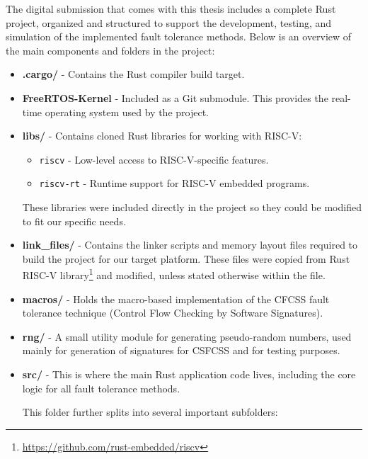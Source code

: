 \documentclass[12pt, letterpaper, slovak]{article}
\begin{document}
\begin{appendices}
The digital submission that comes with this thesis includes a complete Rust project, organized and structured to support the development, testing, and simulation of the implemented fault tolerance methods. Below is an overview of the main components and folders in the project:

\begin{itemize}
    \item \textbf{.cargo/} - Contains the Rust compiler build target.
    
    \item \textbf{FreeRTOS-Kernel} - Included as a Git submodule. This provides the real-time operating system used by the project.
    
    \item \textbf{libs/} - Contains cloned Rust libraries for working with RISC-V:
    \begin{itemize}
        \item \texttt{riscv} - Low-level access to RISC-V-specific features.
        \item \texttt{riscv-rt} - Runtime support for RISC-V embedded programs.
    \end{itemize}
    These libraries were included directly in the project so they could be modified to fit our specific needs.
    
    \item \textbf{link\_files/} - Contains the linker scripts and memory layout files required to build the project for our target platform. These files were copied from Rust RISC-V library\footnote{\url{https://github.com/rust-embedded/riscv}} and modified, unless stated otherwise within the file.
    
    \item \textbf{macros/} - Holds the macro-based implementation of the CFCSS fault tolerance technique (Control Flow Checking by Software Signatures).
    
    \item \textbf{rng/} - A small utility module for generating pseudo-random numbers, used mainly for generation of signatures for CSFCSS and for testing purposes.
    
    \item \textbf{src/} - This is where the main Rust application code lives, including the core logic for all fault tolerance methods.
    
    This folder further splits into several important subfolders:
    

\end{itemize}
\end{appendices}
\end{document}
